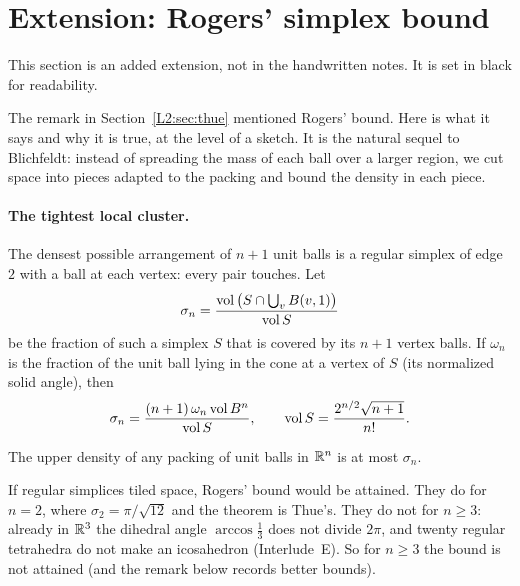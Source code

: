 \section{Extension: Rogers' simplex bound}
\label{L2:sec:rogers}

\begin{addedblock}
This section is an added extension, not in the handwritten notes. It is set in black for readability.
\end{addedblock}

The remark in Section~\ref{L2:sec:thue} mentioned Rogers' bound. Here is what it says and why it is
true, at the level of a sketch. It is the natural sequel to Blichfeldt: instead of spreading the mass of
each ball over a larger region, we cut space into pieces adapted to the packing and bound the density
in each piece.

\paragraph{The tightest local cluster.} The densest possible arrangement of $n+1$ unit balls is a
regular simplex of edge $2$ with a ball at each vertex: every pair touches. Let
\[
  \sigma_n=\frac{\operatorname{vol}\big(S\cap\bigcup_{v}B(v,1)\big)}{\operatorname{vol} S}
\]
be the fraction of such a simplex $S$ that is covered by its $n+1$ vertex balls. If $\omega_n$ is the
fraction of the unit ball lying in the cone at a vertex of $S$ (its normalized solid angle), then
\[
  \sigma_n=\frac{(n+1)\,\omega_n\operatorname{vol}B^n}{\operatorname{vol} S},\qquad \operatorname{vol} S=\frac{2^{n/2}\sqrt{n+1}}{n!}.
\]

\begin{theorem}[Rogers 1958]\label{L2:thm:rogers}
The upper density of any packing of unit balls in $\mathbb{R}^n$ is at most $\sigma_n$.
\end{theorem}

If regular simplices tiled space, Rogers' bound would be attained. They do for $n=2$, where
$\sigma_2=\pi/\sqrt{12}$ and the theorem is Thue's. They do not for $n\ge3$: already in $\mathbb{R}^3$ the
dihedral angle $\arccos\frac13$ does not divide $2\pi$, and twenty regular tetrahedra do not make an
icosahedron (Interlude~E). So for $n\ge3$ the bound is not attained (and the remark below records
better bounds).


